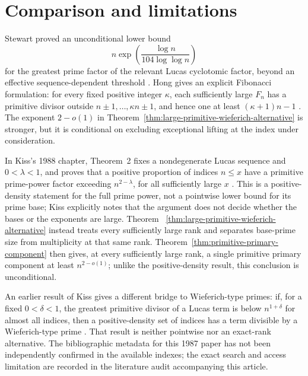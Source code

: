 \section{Comparison and limitations}
\label{sec:comparison}

Stewart proved an unconditional lower bound
\[
 n\exp\!\left(\frac{\log n}{104\log\log n}\right)
\]
for the greatest prime factor of the relevant Lucas cyclotomic factor,
beyond an effective sequence-dependent threshold
\cite[Theorem~1]{Stewart2013DivisorsLucasLehmer}.  Hong gives an explicit
Fibonacci formulation: for every fixed positive integer $\kappa$, each
sufficiently large $F_n$ has a primitive divisor outside
$n\pm1,\ldots,\kappa n\pm1$, and hence one at least
$(\kappa+1)n-1$ \cite[Theorem~1.1]{Hong2025BigPrimitiveDivisors}.  The
exponent $2-o(1)$ in Theorem~\ref{thm:large-primitive-wieferich-alternative}
is stronger, but it is conditional on excluding exceptional lifting at the
index under consideration.

In Kiss's 1988 chapter, Theorem~2 fixes a nondegenerate Lucas sequence and
$0<\lambda<1$, and proves that a positive proportion of indices $n\leq x$
have a primitive prime-power factor exceeding $n^{2-\lambda}$, for all
sufficiently large $x$ \cite[Theorem~2]{Kiss1988PrimitiveDivisors}.  This is
a positive-density statement for the full prime power, not a pointwise lower
bound for its prime base; Kiss explicitly notes that the argument does not
decide whether the bases or the exponents are large.  Theorem~
\ref{thm:large-primitive-wieferich-alternative} instead treats every
sufficiently large rank and separates base-prime size from multiplicity at
that same rank.  Theorem~\ref{thm:primitive-primary-component} then gives,
at every sufficiently large rank, a single primitive primary component at
least $n^{2-o(1)}$; unlike the positive-density result, this conclusion is
unconditional.

An earlier result of Kiss gives a different bridge to Wieferich-type primes:
if, for a fixed $0<\delta<1$, the greatest primitive divisor of a Lucas term
is below $n^{1+\delta}$ for almost all indices, then a positive-density set
of indices has a term divisible by a Wieferich-type prime
\cite{Kiss1987WieferichLucas}.  That result is neither pointwise nor an
exact-rank alternative.  The bibliographic metadata for this 1987 paper has
not been independently confirmed in the available indexes; the exact search
and access limitation are recorded in the literature audit accompanying this
article.

